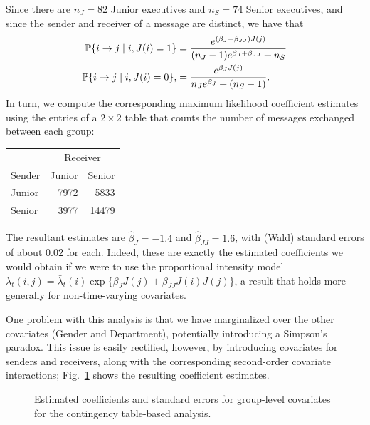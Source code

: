 \documentclass[final]{statsoc}
\begin{document}
Since there are $n_J = 82$ Junior
executives and $n_S = 74$ Senior executives, and since the sender and
receiver of a message are distinct, we have that
\begin{align*}
  \mathbb{P}\{ i \to j \mid i, J(i) = 1 \}
    &=
      \frac{e^{(\beta_J + \beta_{JJ}) J(j)}}
           {(n_J - 1) e^{\beta_J + \beta_{JJ}} + n_S} \\
  \mathbb{P}\{ i \to j \mid i, J(i) = 0 \},
    &=
      \frac{e^{\beta_J J(j)}}
           {n_J e^{\beta_J} + (n_S - 1)}.
\end{align*}
In turn, we compute the corresponding maximum likelihood coefficient estimates using the
entries of a $2 \times 2$ table that counts the number of messages exchanged
between each group:
\begin{center}
\begin{tabular}{lrr}
  \toprule
  & \multicolumn{2}{c}{Receiver} \\
  \cmidrule(l){2-3}
  Sender & Junior & Senior \\
  \midrule
  Junior &  7972  &  5833 \\
  Senior &  3977  & 14479 \\
  \bottomrule
\end{tabular}
\end{center}
The resultant estimates are $\hat \beta_{J} = -1.4$ and
$\hat \beta_{JJ} = 1.6$, with (Wald) standard errors of about $0.02$
for each.  Indeed, these are exactly the estimated coefficients we would
obtain if we were to use the proportional intensity model
$\lambda_t(i,j) = \bar \lambda_t(i) \exp\{ \beta_J J(j) + \beta_{JJ} J(i) J(j)
\}$, a result that holds more generally for non-time-varying covariates.

One problem with this analysis is that we have marginalized over the
other covariates (Gender and Department), potentially introducing a Simpson's
paradox.  This issue is easily rectified, however, by introducing covariates for senders and
receivers, along with the corresponding second-order covariate interactions; 
Fig.~\ref{T:group-static} shows the resulting coefficient estimates.

\begin{figure}
  \centering
  \makebox[\textwidth]{
    \scriptsize
    
  }
  \caption{
    Estimated coefficients and standard errors for group-level covariates
    for the contingency table-based analysis.
  }
  \label{T:group-static}
\end{figure}
\end{document}
